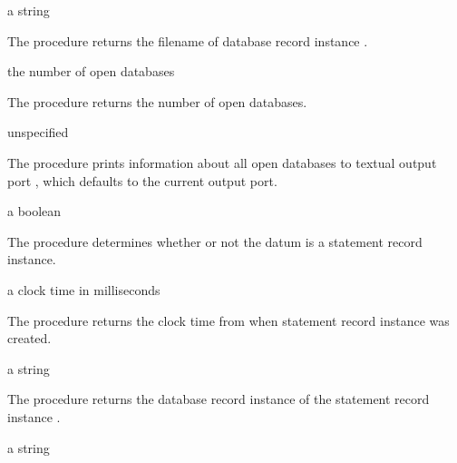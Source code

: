 \begin{procedure}
\end{procedure}
\returns{} a string

The  procedure returns the filename of
database record instance .

\begin{procedure}
\end{procedure}
\returns{} the number of open databases

The  procedure returns the number of open
databases.

\begin{procedure}
\end{procedure}
\returns{} unspecified

The  procedure prints information about all open
databases to textual output port , which defaults to the
current output port.

\begin{procedure}
\end{procedure}
\returns{} a boolean

The  procedure determines whether or not the datum
 is a statement record instance.

\begin{procedure}
\end{procedure}
\returns{} a clock time in milliseconds

The  procedure returns the clock time from
 when statement record instance  was
created.

\begin{procedure}
\end{procedure}
\returns{} a string

The  procedure returns the database record
instance of the statement record instance .

\begin{procedure}
\end{procedure}
\returns{} a string

